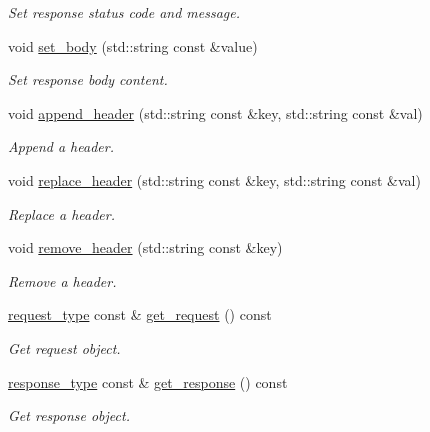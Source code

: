 \begin{DoxyCompactItemize}
\begin{DoxyCompactList}\small\item\em Set response status code and message. \end{DoxyCompactList}\item 
void \hyperlink{classwebsocketpp_1_1connection_a40bb318c3b9294018d217d0271a7b3da}{set\+\_\+body} (std\+::string const \&value)
\begin{DoxyCompactList}\small\item\em Set response body content. \end{DoxyCompactList}\item 
void \hyperlink{classwebsocketpp_1_1connection_af8cb78acc61b8a3d59f6162cdba6318b}{append\+\_\+header} (std\+::string const \&key, std\+::string const \&val)
\begin{DoxyCompactList}\small\item\em Append a header. \end{DoxyCompactList}\item 
void \hyperlink{classwebsocketpp_1_1connection_a96e4adcdb9b3473ca96e2aac27ff7147}{replace\+\_\+header} (std\+::string const \&key, std\+::string const \&val)
\begin{DoxyCompactList}\small\item\em Replace a header. \end{DoxyCompactList}\item 
void \hyperlink{classwebsocketpp_1_1connection_a63094895d9dcfb4d10974ae97ea319a1}{remove\+\_\+header} (std\+::string const \&key)
\begin{DoxyCompactList}\small\item\em Remove a header. \end{DoxyCompactList}\item 
\hyperlink{classwebsocketpp_1_1connection_ac4d9911b0954de83079ce6867a5cf57f}{request\+\_\+type} const \& \hyperlink{classwebsocketpp_1_1connection_ae32374b27c479bec5a3965def867ee0a}{get\+\_\+request} () const 
\begin{DoxyCompactList}\small\item\em Get request object. \end{DoxyCompactList}\item 
\hyperlink{classwebsocketpp_1_1connection_a0d2d5908eaaea749bcf8fd0939b05d3b}{response\+\_\+type} const \& \hyperlink{classwebsocketpp_1_1connection_a7b754f108a5eb806abdf4ee6e96cae41}{get\+\_\+response} () const 
\begin{DoxyCompactList}\small\item\em Get response object. \end{DoxyCompactList}\item 

\end{DoxyCompactItemize}
